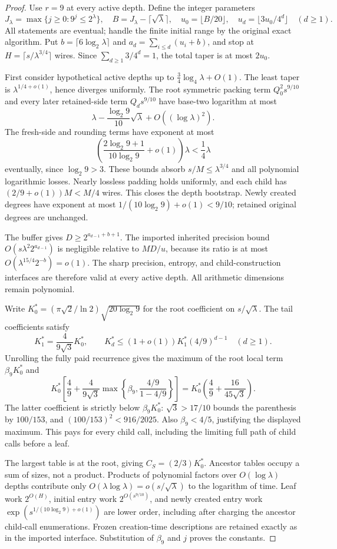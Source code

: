 \begin{proof}
Use $r=9$ at every active depth. Define the integer parameters
\[
 J_\lambda=\max\{j\ge0:9^j\le2^\lambda\},\quad
 B=J_\lambda-\lceil\sqrt\lambda\rceil,\quad
 u_0=\lfloor B/20\rfloor,\quad
 u_d=\lfloor3u_0/4^d\rfloor\quad(d\ge1).
\]
All statements are eventual; handle the finite initial range by the original
exact algorithm. Put $b=\lceil6\log_2\lambda\rceil$ and
$a_d=\sum_{i\le d}(u_i+b)$, and stop at
$H=\lceil s/\lambda^{3/4}\rceil$ wires. Since
$\sum_{d\ge1}3/4^d=1$, the total taper is at most $2u_0$.

First consider hypothetical active depths up to
$\tfrac34\log_4\lambda+O(1)$. The least taper is
$\lambda^{1/4+o(1)}$, hence diverges uniformly. The root symmetric packing
term $Q_0^2s^{9/10}$ and every later retained-side term $Q_ds^{9/10}$ have
base-two logarithm at most
\[
 \lambda-\frac{\log_2 9}{10}\sqrt\lambda
           +O((\log\lambda)^2).
\]
The fresh-side and rounding terms have exponent at most
\[
 \left(\frac{2\log_2 9+1}{10\log_2 9}+o(1)\right)\lambda
  <\frac14\lambda
\]
eventually, since $\log_2 9>3$.
These bounds absorb $s/M\le\lambda^{3/4}$ and all polynomial logarithmic
losses. Nearly lossless padding holds uniformly, and each child has
$(2/9+o(1))M<M/4$ wires. This closes the depth bootstrap. Newly created
degrees have exponent at most $1/(10\log_2 9)+o(1)<9/10$; retained original
degrees are unchanged.

The buffer gives $D\ge2^{a_{d-1}+b+1}$. The imported inherited precision
bound $O(s\lambda^2 2^{a_{d-1}})$ is negligible relative to $MD/u$, because
its ratio is at most $O(\lambda^{15/4}2^{-b})=o(1)$.
The sharp precision, entropy, and child-construction interfaces are therefore
valid at every active depth. All arithmetic dimensions remain polynomial.

Write $K_0^*=(\pi\sqrt2/\ln2)\sqrt{20\log_2 9}$ for the root
coefficient on $s/\sqrt\lambda$. The tail coefficients satisfy
\[
 K_1^*=\frac{4}{9\sqrt3}K_0^*,\qquad
 K_d^*\le(1+o(1))K_1^*(4/9)^{d-1}\quad(d\ge1).
\]
Unrolling the fully paid recurrence gives the maximum of the root local
term $\beta_9K_0^*$ and
\[
 K_0^*\left[\frac49+\frac{4}{9\sqrt3}
 \max\left\{\beta_9,\frac{4/9}{1-4/9}\right\}\right]
 =K_0^*\left(\frac49+\frac{16}{45\sqrt3}\right).
\]
The latter coefficient is strictly below $\beta_9K_0^*$:
$\sqrt3>17/10$ bounds the parenthesis by $100/153$, and
$(100/153)^2<916/2025$. Also $\beta_9<4/5$, justifying the displayed
maximum. This pays for every child call, including the limiting full path
of child calls before a leaf.

The largest table is at the root, giving $C_S=(2/3)K_0^*$.
Ancestor tables occupy a sum of sizes, not a product. Products of polynomial
factors over $O(\log\lambda)$ depths contribute only
$O(\lambda\log\lambda)=o(s/\sqrt\lambda)$ to the logarithm of time.
Leaf work $2^{O(H)}$, initial entry work $2^{O(s^{9/10})}$, and newly
created entry work $\exp(s^{1/(10\log_2 9)+o(1)})$ are lower order,
including after charging the ancestor child-call enumerations. Frozen
creation-time descriptions are retained exactly as in the imported interface.
Substitution of $\beta_9$ and $j$ proves the constants.
\end{proof}


